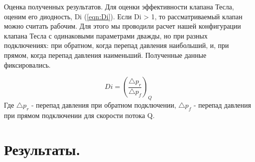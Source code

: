 \documentclass[14pt,a4paper]{article}
\begin{document}
        Оценка полученных результатов. Для оценки эффективности клапана Тесла, оценим его диодность, Di (\ref{eqn:Di}). Если Di > 1, то рассматриваемый клапан можно считать рабочим. Для этого мы проводили расчет нашей конфигурации клапана Тесла с одинаковыми параметрами дважды, но при разных подключениях: при обратном, когда перепад давления наибольший, и, при прямом, когда перепад давления наименьший. Полученные данные фиксировались.         
        
        \begin{equation}\label{eqn:Di}
            Di = (\frac{\bigtriangleup p_{r}}{\bigtriangleup p_{f}})_Q
        \end{equation}
        Где $\bigtriangleup p_{r}$ - перепад давления при обратном подключении, $\bigtriangleup p_{f}$ - перепад давления при прямом подключении для скорости потока Q.
        
        \section*{Результаты.}
        
        
    
\end{document}
